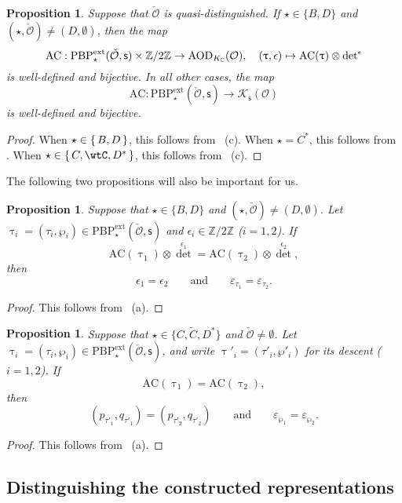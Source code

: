\documentclass[12pt,a4paper]{amsart}
\newcommand{\CK}{{\mathcal {K}}}
\newcommand{\CO}{{\mathcal {O}}}
\newcommand{\Z}{\mathbb{Z}}
\numberwithin{equation}{section}
\newtheorem{prop}[thm]{Proposition}
\theoremstyle{remark}
\def\PBPe{\mathrm{PBP}^{\mathrm{ext}}}
\begin{document}
\begin{prop}\label{thmac3}
Suppose that  $\check \CO$ is quasi-distinguished.  If $\star\in \{B,D\}$ and $(\star, \check \CO)\neq (D, \emptyset)$, then  the map
\[
\mathrm{AC}: \PBPe_\star(\check \CO,\mathsf s)\times \Z/2\Z \rightarrow  \mathrm{AOD}_{K_\C}(\CO),\quad (\uptau, \epsilon)\mapsto \mathrm{AC}(\uptau)\otimes {\det}^{\epsilon}
\]
is well-defined and bijective. In all other cases, the
map
\[
\mathrm{AC}: \PBPe_\star(\check \CO,\mathsf s)\rightarrow  \CK_{\mathsf s}(\CO)
\]
is well-defined and bijective.
\end{prop}
\begin{proof}
When $\star\in \set{B,D}$, this follows from ~(c).
When $\star = C^{*}$, this follows from .
When $\star\in \set{C,\wtC,D^{*}}$, this follows from ~(c).
\end{proof}

The following two propositions will also be important for us.
\begin{prop}\label{thmac4}
Suppose that  $\star\in \{B,D\}$ and $(\star, \check \CO)\neq (D, \emptyset)$. Let $\uptau_i=(\tau_i, \wp_i)\in \PBPe_\star(\check \CO,\mathsf s)$ and $\epsilon_i\in \Z/2\Z$ ($i=1,2$).   If
\[
  \mathrm{AC}(\uptau_1)\otimes {\det}^{\epsilon_1}= \mathrm{AC}(\uptau_2)\otimes {\det}^{\epsilon_2},
\]
then
\[
  \epsilon_1=\epsilon_2\qquad\textrm{and}\qquad \varepsilon_{\tau_1}=\varepsilon_{\tau_2}.
\]
 \end{prop}
\begin{proof}
  This follows from ~(a).
\end{proof}

\begin{prop}\label{thmac5}
Suppose that  $\star\in \{C,\widetilde C, D^*\}$ and $\check \CO\neq \emptyset$. Let $\uptau_i=(\tau_i, \wp_i)\in \PBPe_\star(\check \CO,\mathsf s)$, and write $\uptau'_i=(\tau'_i, \wp'_i)$ for its descent ($i=1,2$).   If
\[
  \mathrm{AC}(\uptau_1)= \mathrm{AC}(\uptau_2),
\]
then
\[
 ( p_{\tau'_1}, q_{\tau'_1})=( p_{\tau'_2}, q_{\tau'_2})\qquad\textrm{and}\qquad \varepsilon_{\wp_1}=\varepsilon_{\wp_2}.
\]
 \end{prop}

\begin{proof}
  This follows from ~(a).
\end{proof}


\subsection{Distinguishing the constructed representations}
\end{document}
